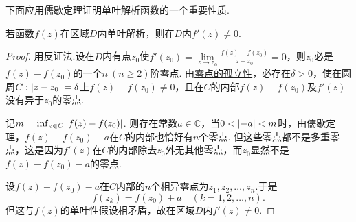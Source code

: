 下面应用儒歇定理证明单叶解析函数的一个重要性质.
\begin{theorem}%
若函数\(f(z)\)在区域\(D\)内单叶解析，则在\(D\)内\(f'(z)\neq0\).
\begin{proof}
用反证法.设在\(D\)内有点\(z_0\)使\(f'(z_0)=\lim\limits_{z \to z_0} \frac{f(z)-f(z_0)}{z-z_0}=0\)，则\(z_0\)必是\(f(z)-f(z_0)\)的一个\(n\ (n\geqslant2)\)阶零点.
由\hyperref[theorem:解析函数的级数表示.解析函数的零点的孤立性]{零点的孤立性}，必存在\(\delta>0\)，使在圆周\(C: \abs{z-z_0}=\delta\)上\(f(z)-f(z_0)\neq0\)，且在\(C\)的内部\(f(z)-f(z_0)\)及\(f'(z)\)没有异于\(z_0\)的零点.

记\(m = \inf_{z \in C} \abs{f(z) - f(z_0)}\).
则存在常数\(a\in\mathbb{C}\)，当\(0<\abs{-a}<m\)时，由儒歇定理，\(f(z)-f(z_0)-a\)在\(C\)的内部也恰好有\(n\)个零点.
但这些零点都不是多重零点，这是因为\(f'(z)\)在\(C\)的内部除去\(z_0\)外无其他零点，而\(z_0\)显然不是\(f(z)-f(z_0)-a\)的零点.

设\(f(z)-f(z_0)-a\)在\(C\)内部的\(n\)个相异零点为\(z_1,z_2,\dotsc,z_n\).于是\[
f(z_k) = f(z_0) + a \quad(k=1,2,\dotsc,n).
\]但这与\(f(z)\)的单叶性假设相矛盾，故在区域\(D\)内\(f'(z)\neq0\).
\end{proof}
\end{theorem}





